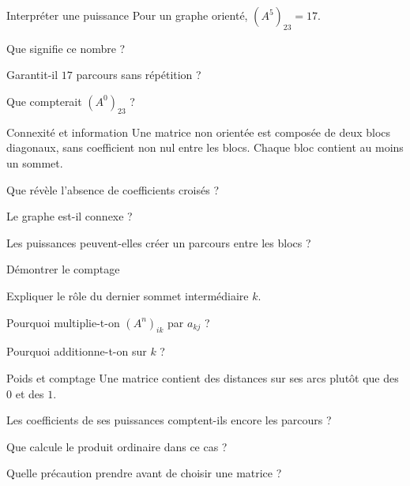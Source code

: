 \begingroup\renewcommand{\otBesoinPlace}[1]{}\begin{minipage}{\linewidth}
\begin{exercice}[3]{Interpréter une puissance}
Pour un graphe orienté, $(A^5)_{23}=17$.
\begin{questions}
\item Que signifie ce nombre ?
\item Garantit-il $17$ parcours sans répétition ?
\item Que compterait $(A^0)_{23}$ ?
\end{questions}
\end{exercice}
\begin{exercice}[3]{Connexité et information}
Une matrice non orientée est composée de deux blocs diagonaux, sans coefficient non nul entre les blocs. Chaque bloc contient au moins un sommet.
\begin{questions}
\item Que révèle l’absence de coefficients croisés ?
\item Le graphe est-il connexe ?
\item Les puissances peuvent-elles créer un parcours entre les blocs ?
\end{questions}
\end{exercice}
\begin{exercice}[3]{Démontrer le comptage}

\begin{questions}
\item Expliquer le rôle du dernier sommet intermédiaire $k$.
\item Pourquoi multiplie-t-on $(A^n)_{ik}$ par $a_{kj}$ ?
\item Pourquoi additionne-t-on sur $k$ ?
\end{questions}
\end{exercice}
\begin{exercice}[3]{Poids et comptage}
Une matrice contient des distances sur ses arcs plutôt que des $0$ et des $1$.
\begin{questions}
\item Les coefficients de ses puissances comptent-ils encore les parcours ?
\item Que calcule le produit ordinaire dans ce cas ?
\item Quelle précaution prendre avant de choisir une matrice ?
\end{questions}
\end{exercice}
\end{minipage}\endgroup
